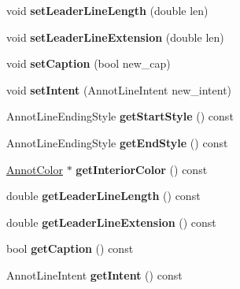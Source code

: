 \begin{DoxyCompactItemize}
\item 
\mbox{\label{class_annot_line_a027fe1e83f605e2a15bf5b5df4513485}} 
void {\bfseries set\+Leader\+Line\+Length} (double len)
\item 
\mbox{\label{class_annot_line_a0573c62ce650b1c837dfff7ee159b3cc}} 
void {\bfseries set\+Leader\+Line\+Extension} (double len)
\item 
\mbox{\label{class_annot_line_a26d2f63a5d490631b3d7eeb481e858b5}} 
void {\bfseries set\+Caption} (bool new\+\_\+cap)
\item 
\mbox{\label{class_annot_line_a20e5f40eb7bcf0066c95d29a059ec3e9}} 
void {\bfseries set\+Intent} (Annot\+Line\+Intent new\+\_\+intent)
\item 
\mbox{\label{class_annot_line_a4d6f4f2d7529d2ea3f52b5a833621450}} 
Annot\+Line\+Ending\+Style {\bfseries get\+Start\+Style} () const
\item 
\mbox{\label{class_annot_line_afab43ccdda90d9557bbf6cfa36111e71}} 
Annot\+Line\+Ending\+Style {\bfseries get\+End\+Style} () const
\item 
\mbox{\label{class_annot_line_a13b51d33c1ae09fcf0d84c97b4ad2f84}} 
\hyperlink{class_annot_color}{Annot\+Color} $\ast$ {\bfseries get\+Interior\+Color} () const
\item 
\mbox{\label{class_annot_line_a1d7c5bd7951914fba6a17d19fad146a7}} 
double {\bfseries get\+Leader\+Line\+Length} () const
\item 
\mbox{\label{class_annot_line_aefc3fa658ffe21cb96b3a005b39937a2}} 
double {\bfseries get\+Leader\+Line\+Extension} () const
\item 
\mbox{\label{class_annot_line_a23c3c25862f16f31f1e0b54960febc29}} 
bool {\bfseries get\+Caption} () const
\item 
\mbox{\label{class_annot_line_a3957c8456600124276c05ceca582328b}} 
Annot\+Line\+Intent {\bfseries get\+Intent} () const

\end{DoxyCompactItemize}
